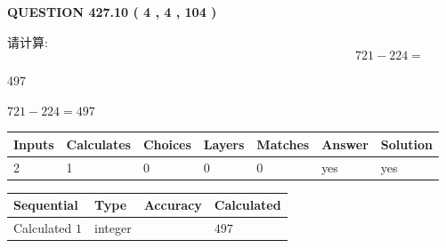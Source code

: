\documentclass{ctexart}
\begin{document}
   
  
\vspace{0.2in}
  
{\textbf{\Large{QUESTION
427.10 
 ( 4 , 4 , 104 )
}}}
  
  
 
请计算:
\begin{equation}
721 -   %
224 = \nonumber
\end{equation}
 
 
 
\noindent{}
 
 

497
 
 
\noindent{}
 
 

 
 
 
\noindent{}
 
 

$ %
721 -  %
224=   %
497$
 
 
\noindent{}
 
 

 
   
   
   
   
\noindent\begin{tabular}{|l|l|l|l|l|l|l|}
 \hline
Inputs & Calculates & Choices & Layers & Matches & Answer & Solution \\ \hline
 2  & 
 1  & 
 0
  & 
 0  & 
 0  & 
  yes & 
  yes 
  \\ \hline
 \end{tabular}
   
   
   
   
\noindent{}
   
   
  
  
\noindent\begin{tabular}{|l|l|l|l|}
\hline
 Sequential & Type & Accuracy & Calculated \\ 
\hline
 
 
  Calculated $  1 $ & integer &  & 
  $ 497 $ 
 \\  \hline  
 \end{tabular}
   
\end{document}

